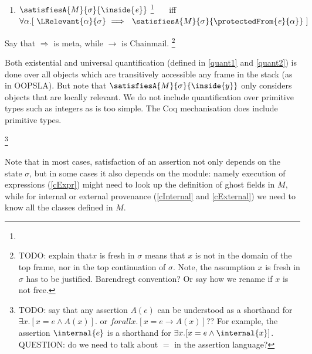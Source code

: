 \begin{enumerate}
\item
$\satisfiesA{M}{\sigma} {\inside {\re}}$ \footnote{}   \ \ \ iff \ \ \ 
{$\forall \alpha.[ \  \LRelevant {\alpha}  {\sigma}\ \Longrightarrow \ \  \satisfiesA{M}{\sigma}{\protectedFrom{\re} {{\alpha}}}\ ] $}
\end{enumerate}

Say that $\Longrightarrow$ is meta, while $\rightarrow$ is Chainmail.
\footnote{{TODO: explain that$x$ is fresh in $\sigma$  means that $x$ is not in the domain of the top frame, nor in the top continuation of $\sigma$.
 Note, the assumption $x$ is fresh in $\sigma$ has to be justified. Barendregt convention? Or say how we rename if $x$ is not free.}}

{Both existential and universal quantification (defined in \ref{quant1} and \ref{quant2}) is done over all objects which are transitively 
accessible any frame in the stack (as in OOPSLA). But note that $\satisfiesA{M}{\sigma} {\inside {y}}$ only considers objects that are locally relevant.
We do not include quantification over primitive types such as integers as \LangOO is too simple. The 
Coq mechanisation does include primitive types.}
 
\footnote{{TODO: say that any assertion $A(e)$ can be understood as a shorthand for $\exists x. [ x=e \wedge A(x)]$. or  $forall x. [ x=e \rightarrow A(x)]$?? For example, the  assertion   ${\internal{e}}$ is a shorthand for $\exists x. [ x=e \wedge {\internal{x}}]$. QUESTION: do we need to talk about $=$ in the assertion language?}}

 Note that in most cases, satisfaction of an assertion not only depends on the state $\sigma$, but 
in some cases it also depends on the module: namely execution of expressions (\ref{cExpr}) might need to look up the definition of ghost fields  in $M$, while 
for internal or external provenance (\ref{cInternal} and \ref{cExternal}) we need to know all the classes defined in $M$.


